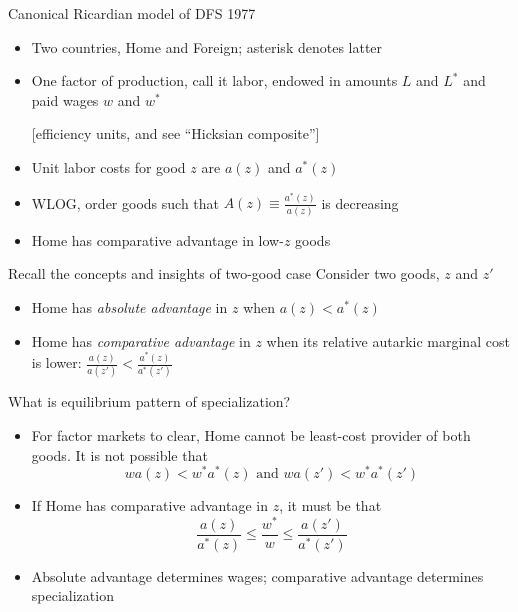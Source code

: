 \documentclass[10pt,notes=hide]{beamer}
\begin{document}
\begin{frame}{Canonical Ricardian model of DFS 1977}
\begin{itemize}
	\item Two countries, Home and Foreign; asterisk denotes latter
	\item One factor of production, call it labor, endowed in amounts $L$ and $L^*$ and paid wages $w$ and $w^*$
	\item[] [efficiency units, and see ``Hicksian composite'']
	\item Unit labor costs for good $z$ are $a(z)$ and $a^*(z)$
	\item WLOG, order goods such that $A(z) \equiv \frac{a^*(z)}{a(z)}$ is decreasing
	\item Home has comparative advantage in low-$z$ goods
\end{itemize}
\end{frame}
\begin{frame}{Recall the concepts and insights of two-good case}
Consider two goods, $z$ and $z'$
\begin{itemize}
	\item Home has \textit{absolute advantage} in $z$ when $a(z) < a^*(z)$
	\item Home has \textit{comparative advantage} in $z$ when its relative autarkic marginal cost is lower: $\frac{a(z)}{a(z')} < \frac{a^*(z)}{a^*(z')}$
\end{itemize}
What is equilibrium pattern of specialization?
\begin{itemize}
	\item For factor markets to clear, Home cannot be least-cost provider of both goods. It is not possible that
	\begin{equation*}w a(z) < w^{*}a^{*}(z) \text{ and } w a(z') < w^*a^*(z')\end{equation*}
	\item If Home has comparative advantage in $z$, it must be that 
	\begin{equation*}\frac{a(z)}{a^*(z)} \leq \frac{w^{*}}{w} \leq \frac{a(z')}{a^*(z')}\end{equation*}
	\item Absolute advantage determines wages; comparative advantage determines specialization
\end{itemize}
\end{frame}
\end{document}
